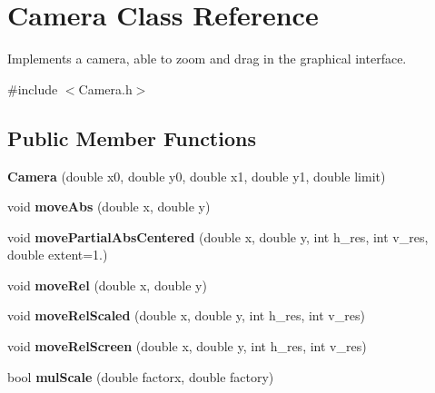 \hypertarget{class_camera}{}\section{Camera Class Reference}
\label{class_camera}


Implements a camera, able to zoom and drag in the graphical interface.  




{\ttfamily \#include $<$Camera.\+h$>$}

\subsection*{Public Member Functions}
\begin{DoxyCompactItemize}
\item 
\hypertarget{class_camera_a216588630410cfa52c6adaf374e240da}{}{\bfseries Camera} (double x0, double y0, double x1, double y1, double limit)\label{class_camera_a216588630410cfa52c6adaf374e240da}

\item 
\hypertarget{class_camera_a7133510d8b81dd969f44d21f07323246}{}void {\bfseries move\+Abs} (double x, double y)\label{class_camera_a7133510d8b81dd969f44d21f07323246}

\item 
\hypertarget{class_camera_aaa843df2a2989b898215726effa15cac}{}void {\bfseries move\+Partial\+Abs\+Centered} (double x, double y, int h\+\_\+res, int v\+\_\+res, double extent=1.)\label{class_camera_aaa843df2a2989b898215726effa15cac}

\item 
\hypertarget{class_camera_a7dd0597323b13c42fee51a6dbb9ca935}{}void {\bfseries move\+Rel} (double x, double y)\label{class_camera_a7dd0597323b13c42fee51a6dbb9ca935}

\item 
\hypertarget{class_camera_a7ae9de71e0fa685debfc94db003b9d8b}{}void {\bfseries move\+Rel\+Scaled} (double x, double y, int h\+\_\+res, int v\+\_\+res)\label{class_camera_a7ae9de71e0fa685debfc94db003b9d8b}

\item 
\hypertarget{class_camera_a0e4d6f609f47758434f7d699226a5450}{}void {\bfseries move\+Rel\+Screen} (double x, double y, int h\+\_\+res, int v\+\_\+res)\label{class_camera_a0e4d6f609f47758434f7d699226a5450}

\item 
\hypertarget{class_camera_a389acf34b48d163f610f7fda36f715da}{}bool {\bfseries mul\+Scale} (double factorx, double factory)\label{class_camera_a389acf34b48d163f610f7fda36f715da}


\end{DoxyCompactItemize}
